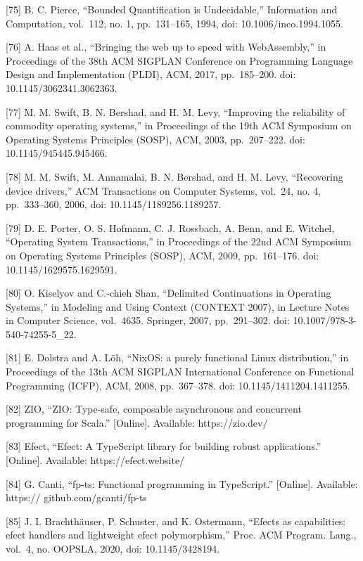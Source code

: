 \documentclass[
  10
]{article}
\begin{document}
{[}75{]} B. C. Pierce, ``Bounded Quantification is Undecidable,''
Information and Computation, vol.~112, no. 1, pp.~131--165, 1994, doi:
10.1006/inco.1994.1055.

{[}76{]} A. Haas et al., ``Bringing the web up to speed with
WebAssembly,'' in Proceedings of the 38th ACM SIGPLAN Conference on
Programming Language Design and Implementation (PLDI), ACM, 2017,
pp.~185--200. doi: 10.1145/3062341.3062363.

{[}77{]} M. M. Swift, B. N. Bershad, and H. M. Levy, ``Improving the
reliability of commodity operating systems,'' in Proceedings of the 19th
ACM Symposium on Operating Systems Principles (SOSP), ACM, 2003,
pp.~207--222. doi: 10.1145/945445.945466.

{[}78{]} M. M. Swift, M. Annamalai, B. N. Bershad, and H. M. Levy,
``Recovering device drivers,'' ACM Transactions on Computer Systems,
vol.~24, no. 4, pp.~333--360, 2006, doi: 10.1145/1189256.1189257.

{[}79{]} D. E. Porter, O. S. Hofmann, C. J. Rossbach, A. Benn, and E.
Witchel, ``Operating System Transactions,'' in Proceedings of the 22nd
ACM Symposium on Operating Systems Principles (SOSP), ACM, 2009,
pp.~161--176. doi: 10.1145/1629575.1629591.

{[}80{]} O. Kiselyov and C.-chieh Shan, ``Delimited Continuations in
Operating Systems,'' in Modeling and Using Context (CONTEXT 2007), in
Lecture Notes in Computer Science, vol.~4635. Springer, 2007,
pp.~291--302. doi: 10.1007/978-3-540-74255-5\_22.

{[}81{]} E. Dolstra and A. Löh, ``NixOS: a purely functional Linux
distribution,'' in Proceedings of the 13th ACM SIGPLAN International
Conference on Functional Programming (ICFP), ACM, 2008, pp.~367--378.
doi: 10.1145/1411204.1411255.

{[}82{]} ZIO, ``ZIO: Type-safe, composable asynchronous and concurrent
programming for Scala.'' {[}Online{]}. Available: https://zio.dev/

{[}83{]} Efect, ``Efect: A TypeScript library for building robust
applications.'' {[}Online{]}. Available: https://efect.website/

{[}84{]} G. Canti, ``fp-ts: Functional programming in TypeScript.''
{[}Online{]}. Available: https:// github.com/gcanti/fp-ts

{[}85{]} J. I. Brachthäuser, P. Schuster, and K. Ostermann, ``Efects as
capabilities: efect handlers and lightweight efect polymorphism,'' Proc.
ACM Program. Lang., vol.~4, no. OOPSLA, 2020, doi: 10.1145/3428194.
\end{document}

